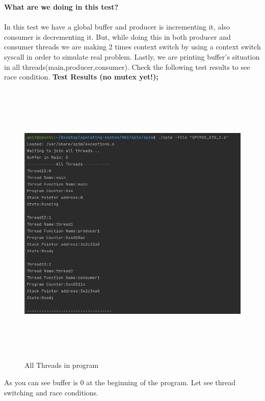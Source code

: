 \documentclass{article}
\begin{document}
\textbf{What are we doing in this test?} \\ \\
In this test we have a global buffer and producer is incrementing it, also consumer is decrementing it. But, while doing this in both
producer and consumer threads we are making 2 times context switch by using a context switch syscall in order to simulate real problem. Lastly,
we are printing buffer's situation in all threads(main,producer,consumer). Check the following test results to see race condition.
\cleardoublepage 
\textbf{Test Results (no mutex yet!);} \\

\begin{figure}[H]
    \centering
	\includegraphics[width=5in, height=5.5in]{18.JPG}
	\caption[Optional caption]{All Threads in program}
	\label{}
\end{figure}
\hfill \break
As you can see buffer is 0 at the beginning of the program. Let see thread switching and race conditions.
\cleardoublepage
\end{document}
